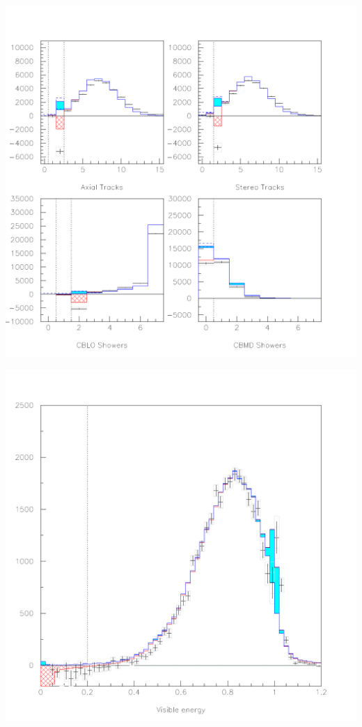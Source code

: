 \documentclass[landscape]{article}
\begin{document}
\begin{center}
  \includegraphics[height=\textheight]{tr2_trigger.pdf}
\end{center}

\begin{center}
  \includegraphics[height=\textheight]{tr2_visen.pdf}
\end{center}
\end{document}
